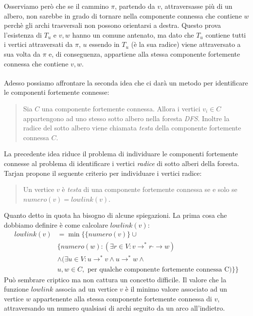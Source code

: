 Osserviamo per\`o che se il cammino $\pi$, partendo da $v$,
attraversasse pi\`u di un albero, non sarebbe in grado di tornare
nella componente connessa che contiene $w$ perch\`e gli archi
trasversali non possono orientarsi a destra. Questo prova l'esistenza
di $T_{u}$ e $v,w$ hanno un comune antenato, ma dato che $T_{u}$
contiene tutti i vertici attraversati da $\pi$, $u$ essendo in $T_{u}$
(\`e la sua radice) viene attraversato a sua volta da $\pi$ e, di
conseguenza, appartiene alla stessa componente fortemente connessa che
contiene $v, w$.
\\\\
Adesso possiamo affrontare la seconda idea che ci dar\`a un metodo per
identificare le componenti fortemente connesse:
\begin{quotation}
  Sia $C$ una componente fortemente connessa. Allora i vertici $v_{i}
  \in C$ appartengono ad uno stesso sotto albero nella foresta
  \emph{DFS}. Inoltre la radice del sotto albero viene chiamata
  \emph{testa} della componente fortemente connessa $C$.
\end{quotation}
La precedente idea riduce il problema di individuare le componenti
fortemente connesse al problema di identificare i vertici
\emph{radice} di sotto alberi della foresta. Tarjan propone il
seguente criterio per individuare i vertici radice:
\begin{quotation}
  Un vertice $v$ \`e \emph{testa} di una componente fortemente
  connessa se e solo se $numero(v) = lowlink(v)$.
\end{quotation}
Quanto detto in quota ha bisogno di alcune spiegazioni. La prima cosa
che dobbiamo definire \`e come calcolare $lowlink(v)$:
\begin{displaymath}
  \begin{split}
    lowlink(v) &= \min \{ \{numero(v)\} \cup \\
      & \{numero(w): (\exists r \in V: v \rightarrow^{*} r
      \cdot\rightarrow w) \\
      & \wedge (\exists u \in V: u \rightarrow^{*} v \wedge u
      \rightarrow^{*} w \wedge \\
      & u,w \in C, \text{ per qualche componente fortemente connessa
        C}) \}\}
  \end{split}
\end{displaymath}
Pu\`o sembrare criptico ma non cattura un concetto difficile. Il
valore che la funzione $lowlink$ associa ad un vertice $v$ \`e il
minimo valore associato ad un vertice $w$ appartenente alla stessa
componente fortemente connessa di $v$, attraversando un numero
qualsiasi di archi seguito da un arco all'indietro.

